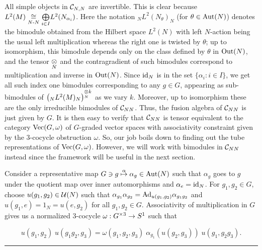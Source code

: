 {All simple objects in $ \mathcal C_{N,N} $ are invertible.
This is clear because $ L^2(M) \underset{N\text{-}N }{\cong}  \underset{i\in I}{\bigoplus} L^2( N_{\alpha_i} ) $. Here the notation $_N L^2 (N_\theta)_N $ (for $ \theta \in \text{Aut} (N) $) denotes the bimodule obtained from the Hilbert space $ L^2 (N) $ with left $ N $-action being the usual left multiplication whereas the right one is twisted by $ \theta $; up to isomorphism, this bimodule depends only on the class defined by $ \theta $ in $ \text{Out} (N)$, and the tensor $ \underset{N}{\otimes} $ and the contragradient of such bimodules correspond to multiplication and inverse in $ \text{Out} (N)$.
Since $ \text{id}_N $ is in the set $\{\alpha_i : i\in I\}  $, we get all such index one bimodules corresponding to any $ g \in G $, appearing as sub-bimodules of $ \left(_N L^2(M)_N \right)^{\underset{N}{\otimes} k}  $ as we vary $ k $.
Moreover, up to isomorphism these are the only irreducible bimodules of $\mathcal C _{N N} $.
Thus, the fusion algebra of $ \mathcal C_{NN} $ is just given by $ G $.
It is then easy to verify that $ \mathcal C_{NN} $ is tensor equivalent to the category $ \text{Vec} (G, \omega) $ of $ G $-graded vector spaces with associativity constraint given by the $ 3 $-cocycle obstruction $ \omega $.
So, our job boils down to finding out the tube representations of $ \text{Vec} (G, \omega) $.
However, we will work with bimodules in $ \mathcal C_{NN} $ instead since the framework will be useful in the next section.

Consider a representative map $ G \ni g \overset{\alpha}{\mapsto} \alpha_g \in \text{Aut} (N) $ such that $ \alpha_g $ goes to $ g  $ under the quotient map over inner automorphisms and $ \alpha_e = \text{id}_N $.
For $ g_1,g_2 \in G$, choose $ u(g_1,g_2) \in \mathcal U (N) $ such that $ \alpha_{g_1} \alpha_{g_2} = \text{Ad}_{u(g_1,g_2)} \alpha_{g_1g_2} $ and $ u(g_1,e) = 1_N = u(e,g_2) $ for all $ g_1 , g_2 \in G $.
Associativity of multiplication in $ G $ gives us a normalized $ 3 $-cocycle $ \omega : G^{ \times 3} \rightarrow S^1 $ such that

\begin{equation}\label{uomega}
u(g_1, g_2) \; u(g_1 g_2, g_3) = \omega (g_1, g_2, g_3) \;  \alpha_{g_1} (u(g_2, g_3)) \;  u(g_1, g_2 g_3).
\end{equation}
\hrule}%





